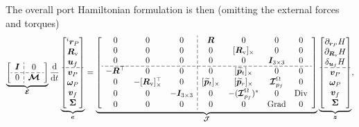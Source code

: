 \documentclass{svjour3}                     %
\DeclareMathOperator*{\Grad}{Grad}
\DeclareMathOperator*{\Div}{Div}
\newcommand{\crmat}[1]{\ensuremath{[#1]_{\times}}}
\begin{document}
The overall port Hamiltonian formulation is then (omitting the external forces and torques)
\begin{equation}
\label{eq:ph_mfd_all}
\setlength{\dashlinegap}{2pt}
\underbrace{
	{\left[ \begin{array}{c:c}
		\bm{I} & 0 \\
		\hdashline
		0 & \bm{\mathcal{M}} \\
		\end{array} \right]}
}_{\bm{\mathcal{E}}}
\diff{}{t}
\underbrace{\begin{bmatrix}
	^i \bm{r}_P \\ \bm{R}_{\text{v}} \\ \bm{u}_f \\\hdashline  \bm{v}_P \\ \bm\omega_P  \\ \bm{v}_f  \\ \bm\Sigma \\
	\end{bmatrix}}_{\bm{e}} = 
\underbrace{
	{\left[ \begin{array}{ccc:cccc}
		0 & 0 & 0 &  \bm{R} & 0 & 0 & 0 \\
		0 & 0 & 0 & 0 & \crmat{\bm{R}_{\text{v}}} & 0 & 0 \\
		0 & 0 & 0 & 0 & 0 & \bm{I}_{3\times 3} & 0  \\ 
		\hdashline
		-\bm{R}^\top & 0 & 0 & 0 & \crmat{\widetilde{\bm{p}}_t} & 0 & 0 \\
		0 & -\crmat{\bm{R}_{\text{v}}}^\top & 0 & \crmat{\widetilde{\bm{p}}_t} & \crmat{\widetilde{\bm{p}}_r} & \bm{\mathcal{I}}_{p_f}^\Omega & 0 \\
		0 & 0 & -\bm{I}_{3\times 3} & 0 & -(\bm{\mathcal{I}}_{p_f}^\Omega)^* & 0 & \Div \\
		0 & 0 & 0 & 0 & 0 & \Grad & 0 \\
		\end{array} \right]}
}_{\bm{\mathcal{J}}}
\underbrace{\begin{bmatrix}
	\partial_{\bm{r}_P}H \\ \partial_{\bm{R}_\text{v}}H \\ \delta_{\bm{u}_f} H \\\hdashline  \bm{v}_P \\ \bm\omega_P  \\ \bm{v}_f  \\ \bm\Sigma \\
	\end{bmatrix}}_{\bm{z}},
\end{equation} 
\end{document}
